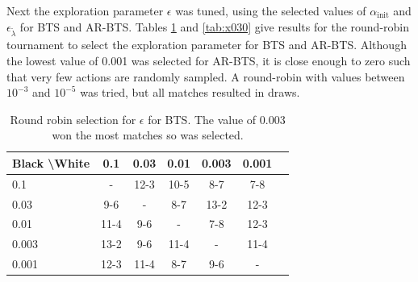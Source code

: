     
    
    
    
    Next the exploration parameter $\epsilon$ was tuned, using the selected values of $\alpha_{\text{init}}$ and $\epsilon_{\tilde{\lambda}}$ for BTS and AR-BTS. Tables \ref{tab:w030} and \ref{tab:x030} give results for the round-robin tournament to select the exploration parameter for BTS and AR-BTS. Although the lowest value of 0.001 was selected for AR-BTS, it is close enough to zero such that very few actions are randomly sampled. A round-robin with values between $10^{-3}$ and $10^{-5}$ was tried, but all matches resulted in draws.
    
    \begin{table}[tbp]
    \centering
        \begin{tabular}{l|cccccc}
            \textbf{Black \textbackslash White}     & 0.1  & 0.03   & 0.01   & 0.003    & 0.001    \\ 
            \hline
                                    0.1            & - & 12-3 & 10-5 & 8-7 & 7-8   		\\
                                    0.03            & 9-6 & - & 8-7 & 13-2 & 12-3   		\\
                                    0.01          & 11-4 & 9-6 & - & 7-8 & 12-3   		\\
                                    0.003          & 13-2 & 9-6 & 11-4 & - & 11-4   		\\
                                    0.001         & 12-3 & 11-4 & 8-7 & 9-6 &   -   	\\    
        \end{tabular}
        \caption[Round robin  selection for $\epsilon$ for BTS.]{Round robin  selection for $\epsilon$ for BTS. The value of 0.003 won the most matches so was selected. \label{tab:w030}}
    \end{table}
    
